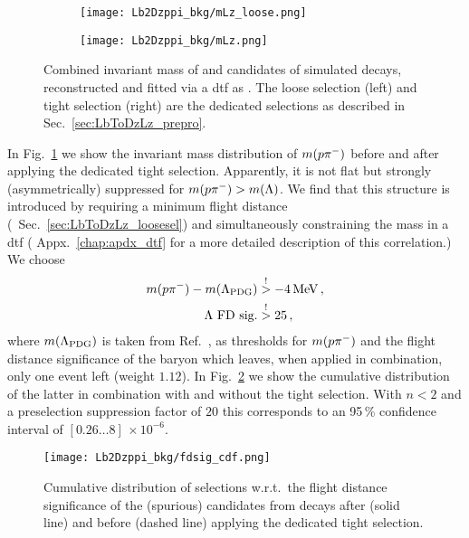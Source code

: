 \begin{figure}[htbp]
    \centering
    \begin{subfigure}{.49\textwidth}
        \centering
        \texttt{[image: Lb2Dzppi\_bkg/mLz\_loose.png]}
    \end{subfigure}
    \begin{subfigure}{.49\textwidth}
        \centering
        \texttt{[image: Lb2Dzppi\_bkg/mLz.png]}
    \end{subfigure}
    \caption{Combined invariant mass of \proton and \pim candidates of simulated \decay{\Lb}{\Dz\proton\pim} decays, reconstructed and fitted via a \gls{dtf} as \decay{\Lb}{\Dz\Lz}. The loose selection (left) and tight selection (right) are the dedicated \decay{\Lb}{\Dz\Lz} selections as described in Sec.~\ref{sec:LbToDzLz_prepro}.}
    \label{fig:LbToDzppi_bkg/mLz}
\end{figure}
In Fig.~\ref{fig:LbToDzppi_bkg/mLz} we show the invariant mass distribution of $m({p}{{\pi}^-})$ before and after applying the dedicated \decay{\Lb}{\Dz\Lz} tight selection.
Apparently, it is not flat but strongly (asymmetrically) suppressed for $m({p}{{\pi}^-})>m({\Lambda})$.
We find that this structure is introduced by requiring a minimum flight distance (\cf{}~Sec.~\ref{sec:LbToDzLz_loosesel}) and simultaneously constraining the \Lz mass in a \gls{dtf} (\cf{} Appx.~\ref{chap:apdx_dtf} for a more detailed description of this correlation.)
We choose
\begin{align*}
    m(\proton\pim) - m(\Lz_\text{PDG}) &\overset{!}{>} -4\mev \,, \\
    \text{\Lz FD sig.} &\overset{!}{>} 25 \,,
\end{align*}
where $m({\Lambda}_\text{PDG})$ is taken from Ref.~\cite{pdg},
as thresholds for $m({p}{{\pi}^-})$ and the flight distance significance of the \Lz baryon which leaves, when applied in combination, only one event left (weight $1.12$).
In Fig.~\ref{fig:Lb2Dzppi_bkg_fdsig_cdf} we show the cumulative distribution of the latter in combination with and without the tight selection.
With $n<2$ and a preselection suppression factor of $20$ this corresponds to an 95\,\% confidence interval of $[0.26 \ldots 8]\,\times 10^{-6}$.
\begin{figure}[htbp]
    \centering
    \texttt{[image: Lb2Dzppi\_bkg/fdsig\_cdf.png]}
    \caption{Cumulative distribution of selections w.r.t.\ the flight distance significance of the (spurious) \Lz candidates from \decay{\Lb}{\Dz\proton\pim} decays after (solid line) and before (dashed line) applying the dedicated tight \decay{\Lb}{\Dz\Lz} selection.}
    \label{fig:Lb2Dzppi_bkg_fdsig_cdf}
\end{figure}

